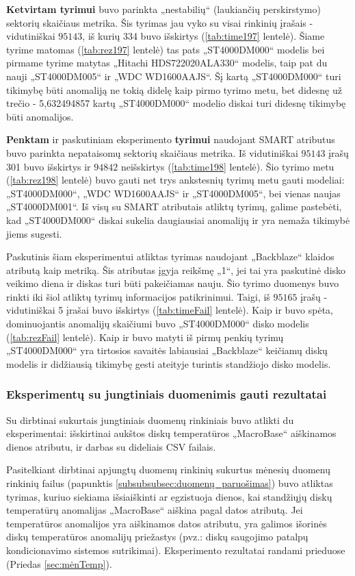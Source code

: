 \documentclass{VUMIFPSkursinis}
\begin{document}
\textbf{Ketvirtam tyrimui} buvo parinkta „nestabilių“ (laukiančių perskirstymo) sektorių skaičiaus metrika. Šis tyrimas jau vyko su visai rinkinių įrašais - vidutiniškai $95 143$, iš kurių 334 buvo išskirtys (\ref{tab:time197} lentelė). Šiame tyrime matomas (\ref{tab:rez197} lentelė) tas pats „ST4000DM000“ modelis bei pirmame tyrime matytas „Hitachi HDS722020ALA330“ modelis, taip pat du nauji „ST4000DM005“ ir „WDC WD1600AAJS“. Šį kartą „ST4000DM000“ turi tikimybę būti anomaliją ne tokią didelę kaip pirmo tyrimo metu, bet didesnę už trečio - 5,632494857 kartų „ST4000DM000“ modelio diskai turi didesnę tikimybę būti anomalijos.

\textbf{Penktam} ir paskutiniam eksperimento \textbf{tyrimui} naudojant SMART atributus buvo parinkta nepataisomų sektorių skaičiaus metrika. Iš vidutiniškai $95 143$ įrašų 301 buvo išskirtys ir $94 842$ neišskirtys (\ref{tab:time198} lentelė). Šio tyrimo metu (\ref{tab:rez198} lentelė) buvo gauti net trys ankstesnių tyrimų metu gauti modeliai: „ST4000DM000“, „WDC WD1600AAJS“ ir „ST4000DM005“, bei vienas naujas „ST4000DM001“. Iš visų su SMART atributais atliktų tyrimų, galime pastebėti, kad „ST4000DM000“ diskai sukelia daugiausiai anomalijų ir yra nemaža tikimybė jiems sugesti.

Paskutinis šiam eksperimentui atliktas tyrimas naudojant „Backblaze“ klaidos atributą kaip metriką. Šis atributas įgyja reikšmę „1“, jei tai yra paskutinė disko veikimo diena ir diskas turi būti pakeičiamas nauju. Šio tyrimo duomenys buvo rinkti iki šiol atliktų tyrimų informacijos patikrinimui. Taigi, iš $95 165$ įrašų - vidutiniškai 5 įrašai buvo išskirtys (\ref{tab:timeFail} lentelė). Kaip ir buvo spėta, dominuojantis anomalijų skaičiumi buvo „ST4000DM000“ disko modelis (\ref{tab:rezFail} lentelė). Kaip ir buvo matyti iš pirmų penkių tyrimų „ST4000DM000“ yra tirtosios savaitės labiausiai „Backblaze“ keičiamų diskų modelis ir didžiausią tikimybę gesti ateityje turintis standžiojo disko modelis.

\subsubsection{Eksperimentų su jungtiniais duomenimis gauti rezultatai}
Su dirbtinai sukurtais jungtiniais duomenų rinkiniais buvo atlikti du eksperimentai: išskirtinai aukštos diskų temperatūros „MacroBase“ aiškinamos dienos atributu, ir darbas su dideliais CSV failais.

 \label{subsubsubsec:mėn}
Pasitelkiant dirbtinai apjungtų duomenų rinkinių sukurtus mėnesių duomenų rinkinių failus (papunktis \ref{subsubsubsec:duomenų_paruošimas}) buvo atliktas tyrimas, kuriuo siekiama išsiaiškinti ar egzistuoja dienos, kai standžiųjų diskų temperatūrų anomalijas „MacroBase“ aiškina pagal datos atributą. Jei temperatūros anomalijos yra aiškinamos datos atributu, yra galimos išorinės diskų temperatūros anomalijų priežastys (pvz.: diskų saugojimo patalpų kondicionavimo sistemos sutrikimai). Eksperimento rezultatai randami prieduose (Priedas \ref{sec:mėnTemp}).\par
\end{document}
